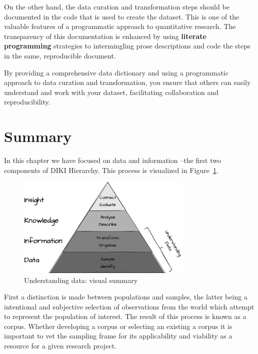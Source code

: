 \documentclass[
  letterpaper,
  DIV=11,
  numbers=noendperiod]{scrreport}
\theoremstyle{definition}
\theoremstyle{remark}
\begin{document}
On the other hand, the data curation and transformation steps should be
documented in the code that is used to create the dataset. This is one
of the valuable features of a programmatic approach to quantitative
research. The transparency of this documentation is enhanced by using
\textbf{literate programming} strategies to intermingling prose
descriptions and code the steps in the same, reproducible document.

By providing a comprehensive data dictionary and using a programmatic
approach to data curation and transformation, you ensure that others can
easily understand and work with your dataset, facilitating collaboration
and reproducibility.

\hypertarget{summary-1}{%
\section*{Summary}\label{summary-1}}


In this chapter we have focused on data and information --the first two
components of DIKI Hierarchy. This process is visualized in
Figure~\ref{fig-understanding-data-vis-sum}.

\begin{figure}[H]

{\centering \includegraphics[width=0.75\textwidth,height=\textheight]{figures/understanding-data/ud-diki.drawio.png}

}

\caption{\label{fig-understanding-data-vis-sum}Understanding data:
visual summary}

\end{figure}

First a distinction is made between populations and samples, the latter
being a intentional and subjective selection of observations from the
world which attempt to represent the population of interest. The result
of this process is known as a corpus. Whether developing a corpus or
selecting an existing a corpus it is important to vet the sampling frame
for its applicability and viability as a resource for a given research
project.
\end{document}
